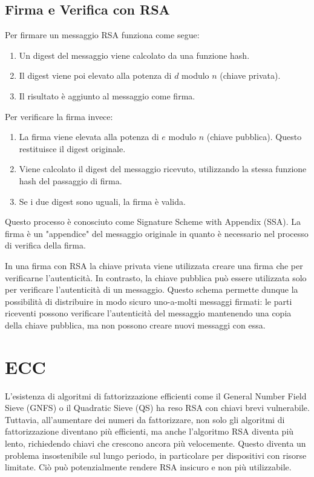 \documentclass{article}
\begin{document}
\subsection{Firma e Verifica con RSA}
Per firmare un messaggio RSA funziona come segue:
\begin{enumerate}
	\item Un digest del messaggio viene calcolato da una funzione hash.
	\item Il digest viene poi elevato alla potenza di $d$ modulo $n$ (chiave privata).
	\item Il risultato è aggiunto al messaggio come firma.
\end{enumerate}
Per verificare la firma invece:
\begin{enumerate}
	\item La firma viene elevata alla potenza di $e$ modulo $n$ (chiave pubblica). Questo restituisce il digest originale.
	\item Viene calcolato il digest del messaggio ricevuto, utilizzando la stessa funzione hash del passaggio di firma.
	\item Se i due digest sono uguali, la firma è valida.
\end{enumerate}

Questo processo è conosciuto come Signature Scheme with Appendix (SSA).
La firma è un "appendice" del messaggio originale in quanto è necessario nel processo di verifica della firma.

In una firma con RSA la chiave privata viene utilizzata creare una firma che per verificarne l'autenticità.
In contrasto, la chiave pubblica può essere utilizzata solo per verificare l'autenticità di un messaggio.
Questo schema permette dunque la possibilità di distribuire in modo sicuro uno-a-molti messaggi firmati: le parti riceventi possono verificare l'autenticità del messaggio mantenendo una copia della chiave pubblica, ma non possono creare nuovi messaggi con essa.

\section{ECC}
L'esistenza di algoritmi di fattorizzazione efficienti come il General Number Field Sieve (GNFS) o il Quadratic Sieve (QS) ha reso RSA con chiavi brevi vulnerabile.
Tuttavia, all'aumentare dei numeri da fattorizzare, non solo gli algoritmi di fattorizzazione diventano più efficienti, ma anche l'algoritmo RSA diventa più lento, richiedendo chiavi che crescono ancora più velocemente.
Questo diventa un problema insostenibile sul lungo periodo, in particolare per dispositivi con risorse limitate.
Ciò può potenzialmente rendere RSA insicuro e non più utilizzabile.
\end{document}
